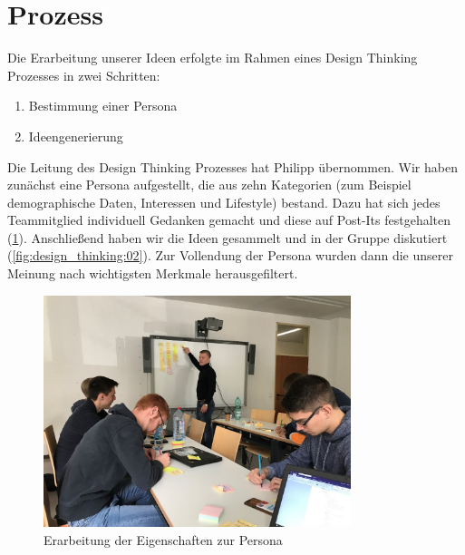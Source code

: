 \section{Prozess}

Die Erarbeitung unserer Ideen erfolgte im Rahmen eines Design Thinking Prozesses in zwei Schritten:

\begin{enumerate}
\item Bestimmung einer Persona
\item Ideengenerierung
\end{enumerate}

Die Leitung des Design Thinking Prozesses hat Philipp übernommen. Wir haben zunächst eine Persona aufgestellt, die aus zehn Kategorien (zum Beispiel demographische Daten, Interessen und Lifestyle) bestand. Dazu hat sich jedes Teammitglied individuell Gedanken gemacht und diese auf Post-Its festgehalten (\ref{fig:design_thinking:01}). Anschließend haben wir die Ideen gesammelt und in der Gruppe diskutiert (\ref{fig:design_thinking:02}). Zur Vollendung der Persona wurden dann die unserer Meinung nach wichtigsten Merkmale herausgefiltert.
 
\begin{figure}[h]
\centering
\includegraphics[width=0.8\textwidth]{images/design_thinking/01}
\caption[Erarbeitung der Eigenschaften zur Persona]{Erarbeitung der Eigenschaften zur Persona}
\label{fig:design_thinking:01}
\end{figure}
 
